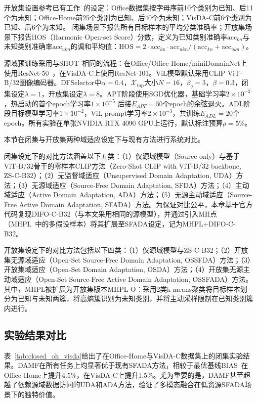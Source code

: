 开放集设置参考已有工作~\cite{liu2021separate}的设定：Office数据集按字母序前10个类别为已知、后11个为未知；Office-Home前25个类别为已知、后40个为未知；VisDA-C前6个类别为已知、后6个为未知。
闭集场景下报告所有目标样本的平均分类准确率；开放集场景下报告HOS（Harmonic Open-set Score）分数，定义为已知类别准确率$\mathrm{acc}_{kn}$与未知类别准确率$\mathrm{acc}_{ukn}$的调和平均值：$\mathrm{HOS}=2\cdot\mathrm{acc}_{kn}\cdot\mathrm{acc}_{ukn}/(\mathrm{acc}_{kn}+\mathrm{acc}_{ukn})$。

源域预训练采用与SHOT~\cite{liang2021source}相同的流程：在Office/Office-Home/miniDomainNet上使用ResNet-50~\cite{he2016deep}，在VisDA-C上使用ResNet-101。ViL模型默认采用CLIP ViT-B/32图像编码器。DFSelector中$\alpha=0.4$，$\mathcal{X}_{\text{top}}$大小$N=16$，$\beta_q=3$，$\beta=0.3$，闭集设定$\lambda=1$，开放集设定$\lambda=8$。APT阶段使用SGD优化器，基础学习率$2\times 10^{-3}$，热启动的首个epoch学习率$1\times 10^{-5}$ 后接$E_{APT}=50$个epoch的余弦退火。ADL阶段目标模型学习率$1\times 10^{-2}$，ViL prompt学习率$2\times 10^{-3}$，共训练$E_{ADL}=20$个epoch。所有实验在单张NVIDIA RTX 4090 GPU上运行，默认标注预算$\rho=5\%$。


本节在闭集与开放集两种域适应设定下与现有方法进行系统对比。

闭集设定下的对比方法涵盖以下五类：（1）仅源域模型（Source-only）与基于ViT-B/32骨干的零样本CLIP方法（Zero-Shot CLIP with ViT-B/32 backbone, ZS-C-B32）；（2）无监督域适应（Unsupervised Domain Adaptation, UDA）方法；（3）无源域适应（Source-Free Domain Adaptation, SFDA）方法；（4）主动域适应（Active Domain Adaptation, ADA）方法；（5）无源主动域适应（Source-Free Active Domain Adaptation, SFADA）方法。为保证对比公平，本章基于官方代码复现DIFO-C-B32（与本文采用相同的源模型），并通过引入MH点（MHPL~\cite{wang2023mhpl}中的多假设样本）将其扩展至SFADA设定，记为MHPL+DIFO-C-B32。

开放集设定下的对比方法包括以下四类：（1）仅源域模型与ZS-C-B32；（2）开放集无源域适应（Open-Set Source-Free Domain Adaptation, OSSFDA）方法；（3）开放集域适应（Open-Set Domain Adaptation, OSDA）方法；（4）开放集无源主动域适应（Open-Set Source-Free Active Domain Adaptation, OSSFADA）方法。其中，MHPL被扩展为开放集版本MHPL-O：采用2类k-means聚类将目标样本划分为已知与未知两簇，将高熵簇识别为未知类别，并将主动采样限制在已知类别簇内进行。

\subsection{实验结果对比}

表~\ref{tab:closed_oh_visda}给出了在Office-Home与VisDA-C数据集上的闭集实验结果。DAMF在所有任务上均显著优于现有SFADA方法，相较于最优基线BIAS~\cite{wang2024bias}在Office-Home上提升4.5\%，在VisDA-C上提升1.5\%。尤为重要的是，DAMF甚至超越了依赖源域数据访问的UDA和ADA方法，验证了多模态融合在低资源SFADA场景下的独特价值。

